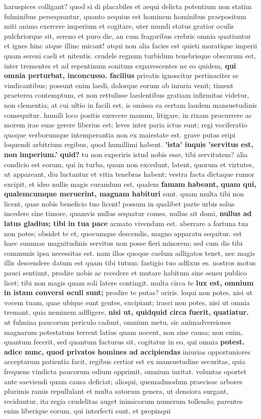 haruspices colligant? quod si di placabiles et aequi delicta potentium non statim fulminibus persequuntur, quanto aequius est hominem hominibus praepositum miti animo exercere imperium et cogitare, uter mundi status gratior oculis pulchriorque sit, sereno et puro die, an cum fragoribus crebris omnia quatiuntur et ignes hinc atque illinc micant! atqui non alia facies est quieti moratique imperii quam sereni caeli et nitentis. crudele regnum turbidum tenebrisque obscurum est, inter trementes et ad repentinum sonitum expavescentes ne eo quidem, \textbf{qui \textbf{omnia perturbat, inconcusso. facilius}} privatis ignoscitur pertinaciter se vindicantibus; possunt enim laedi, dolorque eorum ab iniuria venit; timent praeterea contemptum, et non rettulisse laedentibus gratiam infirmitas videtur, non clementia; at cui ultio in facili est, is omissa ea certam laudem mansuetudinis consequitur. humili loco positis exercere manum, litigare, in rixam procurrere ac morem irae suae gerere liberius est; leves inter paria ictus sunt; regi vociferatio quoque verborumque intemperantia non ex maiestate est. grave putas eripi loquendi arbitrium regibus, quod humillimi habent. \textbf{'ista' inquis 'servitus est, non imperium.' quid?} tu non experiris istud nobis esse, tibi servitutem? alia condicio est eorum, qui in turba, quam non excedunt, latent, quorum et virtutes, ut appareant, diu luctantur et vitia tenebras habent; vestra facta dictaque rumor excipit, et ideo nullis magis curandum est, qualem \textbf{famam habeant, quam \textbf{qui, qualemcumque meruerint,} magnam habituri} sunt. quam multa tibi non licent, quae nobis beneficio tuo licent! possum in qualibet parte urbis solus incedere sine timore, quamvis nullus sequatur comes, nullus sit domi, \textbf{nullus ad latus gladius; tibi in tua pace} armato vivendum est. aberrare a fortuna tua non potes; obsidet te et, quocumque descendis, magno apparatu sequitur. est haec summae magnitudinis servitus non posse fieri minorem; sed cum dis tibi communis ipsa necessitas est. nam illos quoque caelum adligatos tenet, nec magis illis descendere datum est quam tibi tutum: fastigio tuo adfixus es. nostros motus pauci sentiunt, prodire nobis ac recedere et mutare habitum sine sensu publico licet; tibi non magis quam soli latere contingit. multa circa te \textbf{lux est, omnium in istam conversi oculi sunt;} prodire te putas? oriris. loqui non potes, nisi ut vocem tuam, quae ubique sunt gentes, excipiant; irasci non potes, nisi ut omnia tremant, quia neminem adfligere, \textbf{nisi ut, quidquid circa fuerit, quatiatur.} ut fulmina paucorum periculo cadunt, omnium metu, sic animadversiones magnarum potestatum terrent latius quam nocent, non sine causa; non enim, quantum fecerit, sed quantum facturus sit, cogitatur in eo, qui omnia \textbf{potest. adice \textbf{nunc, quod privatos homines ad} accipiendas} iniurias opportuniores acceptarum patientia facit, regibus certior est ex mansuetudine securitas, quia frequens vindicta paucorum odium opprimit, omnium inritat. voluntas oportet ante saeviendi quam causa deficiat; alioqui, quemadmodum praecisae arbores plurimis ramis repullulant et multa satorum genera, ut densiora surgant, reciduntur, ita regia crudelitas auget inimicorum numerum tollendo; parentes enim liberique eorum, qui interfecti sunt, et propinqui 